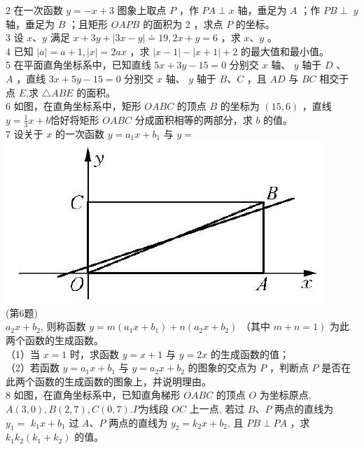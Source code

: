 \documentclass[10pt]{article}
\begin{document}
2 在一次函数 $y=-x+3$ 图象上取点 $P$ ，作 $P A \perp x$ 轴，垂足为 $A$ ；作 $P B \perp$ $y$ 轴，垂足为 $B$ ；且矩形 $O A P B$ 的面积为 2 ，求点 $P$ 的坐标。\\
3 设 $x 、 y$ 满足 $x+3 y+|3 x-y| \doteq 19,2 x+y=6$ ，求 $x 、 y$ 。\\
4 已知 $|a|=a+1,|x|=2 a x$ ，求 $|x-1|-|x+1|+2$ 的最大值和最小值。\\
5 在平面直角坐标系中，已知直线 $5 x+3 y-15=0$ 分别交 $x$ 轴、 $y$ 轴于 $D$ 、\\
$A$ ，直线 $3 x+5 y-15=0$ 分别交 $x$ 轴、 $y$ 轴于 $B 、 C$ ，且 $A D$ 与 $B C$ 相交于点 $E$,求 $\triangle A B E$ 的面积。\\
6 如图，在直角坐标系中，矩形 $O A B C$ 的顶点 $B$ 的坐标为 $(15,6)$ ，直线 $y=\frac{1}{3} x+b$恰好将矩形 $O A B C$ 分成面积相等的两部分，求 $b$ 的值。\\
7 设关于 $x$ 的一次函数 $y=a_{1} x+b_{1}$ 与 $y=$\\
\includegraphics[max width=\textwidth, center]{2024_10_30_1bf34f7aeb61f11d11d3g-022(1)}\\
(第6题)\\
$a_{2} x+b_{2}$, 则称函数 $y=m\left(a_{1} x+b_{1}\right)+n\left(a_{2} x+b_{2}\right)$ （其中 $\left.m+n=1\right)$ 为此两个函数的生成函数。\\
（1）当 $x=1$ 时，求函数 $y=x+1$ 与 $y=2 x$ 的生成函数的值；\\
（2）若函数 $y=a_{1} x+b_{1}$ 与 $y=a_{2} x+b_{2}$ 的图象的交点为 $P$ ，判断点 $P$ 是否在此两个函数的生成函数的图象上，并说明理由。\\
8 如图，在直角坐标系中，已知直角梯形 $O A B C$ 的顶点 $O$ 为坐标原点, $A(3,0), B(2,7), C(0,7) . P$为线段 $O C$ 上一点, 若过 $B 、 P$ 两点的直线为 $y_{1}=$ $k_{1} x+b_{1}$ 过 $A 、 P$ 两点的直线为 $y_{2}=k_{2} x+b_{2}$, 且 $P B \perp P A$ ，求 $k_{1} k_{2}\left(k_{1}+k_{2}\right)$ 的值。\\
\end{document}
